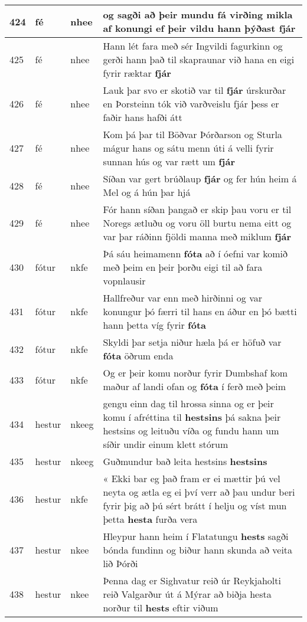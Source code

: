 \documentclass{article}
\begin{document}
\begin{longtable}{p{1cm}|p{1cm}|p{1cm}|p{13cm}}
\hline
424&fé&nhee&og sagði að þeir mundu fá virðing mikla af konungi ef þeir vildu hann þýðast \textbf{fjár} \\
\hline
425&fé&nhee&Hann lét fara með sér Ingvildi fagurkinn og gerði hann það til skapraunar við hana en eigi fyrir ræktar \textbf{fjár} \\
\hline
426&fé&nhee&Lauk þar svo er skotið var til \textbf{fjár} úrskurðar en Þorsteinn tók við varðveislu fjár þess er faðir hans hafði átt\\
\hline
427&fé&nhee&Kom þá þar til Böðvar Þórðarson og Sturla mágur hans og sátu menn úti á velli fyrir sunnan hús og var rætt um \textbf{fjár} \\
\hline
428&fé&nhee&Síðan var gert brúðlaup \textbf{fjár} og fer hún heim á Mel og á hún þar hjá\\
\hline
429&fé&nhee&Fór hann síðan þangað er skip þau voru er til Noregs ætluðu og voru öll burtu nema eitt og var þar ráðinn fjöldi manna með miklum \textbf{fjár} \\
\hline
430&fótur&nkfe&Þá sáu heimamenn \textbf{fóta} að í óefni var komið með þeim en þeir þorðu eigi til að fara vopnlausir\\
\hline
431&fótur&nkfe&Hallfreður var enn með hirðinni og var konungur þó færri til hans en áður en þó bætti hann þetta víg fyrir \textbf{fóta} \\
\hline
432&fótur&nkfe&Skyldi þar setja niður hæla þá er höfuð var \textbf{fóta} öðrum enda\\
\hline
433&fótur&nkfe&Og er þeir komu norður fyrir Dumbshaf kom maður af landi ofan og \textbf{fóta} í ferð með þeim\\
\hline
434&hestur&nkeeg&gengu einn dag til hrossa sinna og er þeir komu í afréttina til \textbf{hestsins} þá sakna þeir hestsins og leituðu víða og fundu hann um síðir undir einum klett stórum\\
\hline
435&hestur&nkeeg&Guðmundur bað leita hestsins \textbf{hestsins} \\
\hline
436&hestur&nkfe&« Ekki bar eg það fram er ei mættir þú vel neyta og ætla eg ei því verr að þau undur beri fyrir þig að þú sért brátt í helju og víst mun þetta \textbf{hesta} furða vera\\
\hline
437&hestur&nkee&Hleypur hann heim í Flatatungu \textbf{hests} sagði bónda fundinn og biður hann skunda að veita lið Þórði\\
\hline
438&hestur&nkee&Þenna dag er Sighvatur reið úr Reykjaholti reið Valgarður út á Mýrar að biðja hesta norður til \textbf{hests} eftir viðum\\

\end{longtable}
\end{document}
